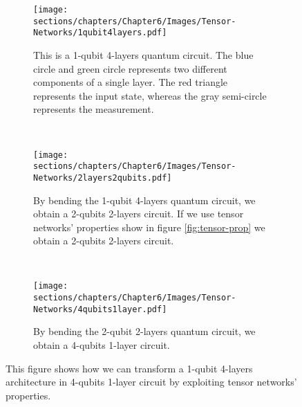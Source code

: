 \begin{itemize}
    \begin{figure}[h]
        \centering
        \begin{subfigure}[b]{\textwidth}
            \texttt{[image: sections/chapters/Chapter6/Images/Tensor-Networks/1qubit4layers.pdf]}
        \caption{This is a 1-qubit 4-layers quantum circuit. The blue circle and green circle represents two
        different components of a single layer. The red triangle represents the input state, whereas the 
        gray semi-circle represents the measurement.}
        \label{fig:1q-4l}
        \end{subfigure}
        \\[3ex]
        \begin{subfigure}[b]{\textwidth}
        \centering
            \texttt{[image: sections/chapters/Chapter6/Images/Tensor-Networks/2layers2qubits.pdf]}
        \caption{By bending the 1-qubit 4-layers quantum circuit, we obtain a 2-qubits 2-layers circuit. If 
        we use tensor networks' properties show in figure \ref{fig:tensor-prop} we obtain a 2-qubits 
        2-layers circuit.}
        \label{fig:2q-2l}
        \end{subfigure}
        \\[3ex]
        \begin{subfigure}[b]{\textwidth}
        \centering
            \texttt{[image: sections/chapters/Chapter6/Images/Tensor-Networks/4qubits1layer.pdf]}
        \caption{By bending the 2-qubit 2-layers quantum circuit, we obtain a 4-qubits 1-layer circuit.}
        \label{fig:4q-1l}
        \end{subfigure}
        \caption{This figure shows how we can transform a 1-qubit 4-layers architecture in 4-qubits 1-layer 
        circuit by exploiting tensor networks' properties.}
    \end{figure}

    


\end{itemize}